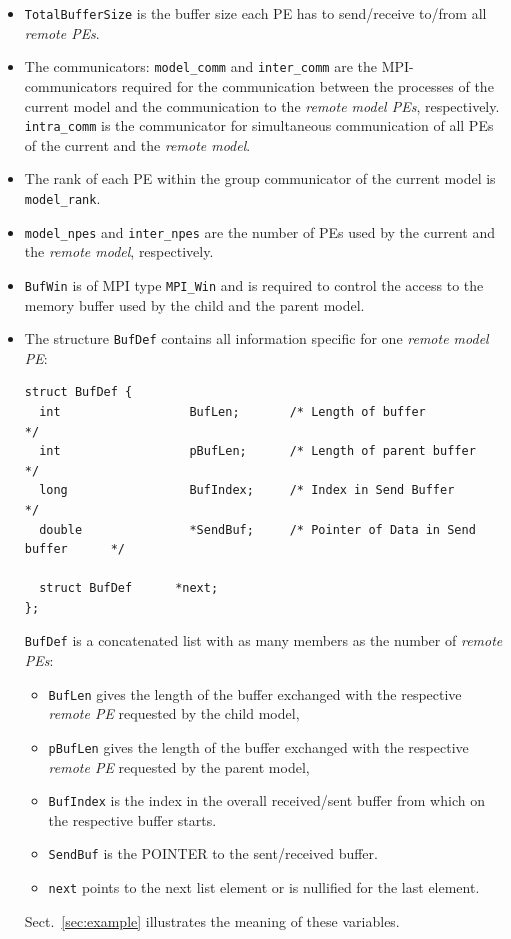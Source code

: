 \documentclass[twoside]{article}
\begin{document}
\begin{itemize}
\item \verb|TotalBufferSize| is the buffer size each PE has to send/receive 
to/from all {\it remote PEs}. 
\item The communicators: \verb|model_comm| and \verb|inter_comm| are the 
MPI-communicators required for the communication between the processes of the 
current
 model and the communication to the {\it remote model PEs}, respectively.  
\verb|intra_comm| is the communicator for simultaneous communication of all PEs
 of the current and the {\it remote model}.
\item  The rank of each PE within the group communicator of the current model
        is \verb|model_rank|.
\item \verb|model_npes| and \verb|inter_npes| are the number of PEs used by the
current and the {\it remote model}, respectively.
\item \verb|BufWin| is of MPI type \verb|MPI_Win| and is required to control the
access to the memory buffer used by the child and the parent model.
\item The structure \verb|BufDef| contains all  information
specific for one {\it remote model PE}:
\begin{verbatim}
struct BufDef {
  int                  BufLen;       /* Length of buffer                    */
  int                  pBufLen;      /* Length of parent buffer             */
  long                 BufIndex;     /* Index in Send Buffer                */ 
  double               *SendBuf;     /* Pointer of Data in Send buffer      */
 
  struct BufDef      *next; 
};
\end{verbatim}
\verb|BufDef| is a concatenated list with as many members as the number of
{\it remote PEs}:
\begin{itemize}
\item \verb|BufLen| gives the length of the buffer exchanged
with the respective {\it remote PE} requested by the child model, 
\item \verb|pBufLen| gives the length of the buffer exchanged
with the respective {\it remote PE} requested by the parent model, 
\item \verb|BufIndex| is the index in the overall
received/sent buffer from which on the respective buffer starts.
\item \verb|SendBuf| is the {\footnotesize POINTER} to the sent/received buffer. 
\item \verb|next| points to the next list element or is nullified
for the last element. 
\end{itemize}
Sect.\ \ref{sec:example} illustrates the meaning of these variables.
\end{itemize}
\end{document}
